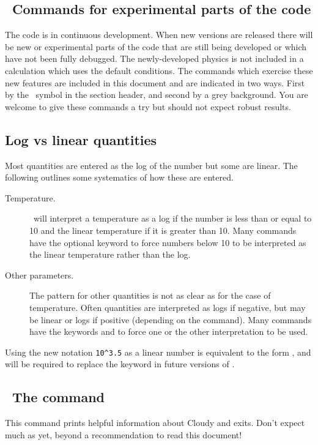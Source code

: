 \begin{shaded}
\subsection{\experimental\ Commands for experimental parts of the code}

The code is in continuous development. When new versions are released there
will be new or experimental parts of the code that are still being developed
or which have not been fully debugged. The newly-developed physics is not
included in a calculation which uses the default conditions.
The commands
which exercise these new features are included in this document
and are indicated in two ways.
First by the \experimental\ symbol in the section
header, and second by a grey background. You are welcome to give these
commands a try but should not expect robust results.
\end{shaded}

\subsection{Log vs linear quantities}

Most
quantities are entered as the log of the number but some are linear.
The
following outlines some systematics of how these are entered.
\begin{description}
\item[Temperature.]  \Cloudy\ will interpret a temperature as a log if the number
is less than or equal to 10 and the linear temperature if it is greater
than 10.  Many commands have the optional keyword  to force numbers
below 10 to be interpreted as the linear temperature rather than the log.

\item[Other parameters.]  The pattern for other quantities is not as clear as
for the case of temperature.  Often quantities are interpreted as logs if
negative, but may be linear or logs if positive (depending on the command).
Many commands have the keywords  and  to force one or the other
interpretation to be used.

\end{description}

Using the new notation \verb|10^3.5| as a linear number is equivalent
to the form , and will be required to replace the
 keyword in future versions of \Cloudy.

\begin{shaded}
\subsection{\experimental\ The  command}

This command prints helpful information about Cloudy and exits.  Don't
expect much as yet, beyond a recommendation to read this document!

\end{shaded}

